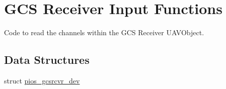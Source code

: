 \hypertarget{group___p_i_o_s___g_c_s_r_c_v_r}{\section{G\-C\-S Receiver Input Functions}
\label{group___p_i_o_s___g_c_s_r_c_v_r}
}


Code to read the channels within the G\-C\-S Receiver U\-A\-V\-Object.  


\subsection*{Data Structures}
\begin{DoxyCompactItemize}
\item 
struct \hyperlink{structpios__gcsrcvr__dev}{pios\-\_\-gcsrcvr\-\_\-dev}
\end{DoxyCompactItemize}
